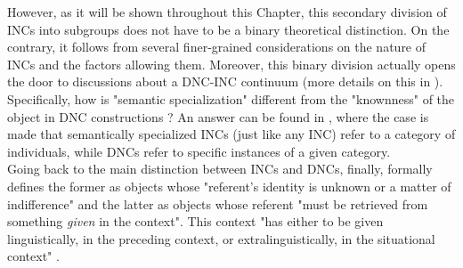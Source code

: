 However, as it will be shown throughout this Chapter, this secondary division of INCs into subgroups does not have to be a binary theoretical distinction. On the contrary, it follows from several finer-grained considerations on the nature of INCs and the factors allowing them. Moreover, this binary division actually opens the door to discussions about a DNC-INC continuum (more details on this in ). Specifically, how is "semantic specialization" different from the "knownness" of the object in DNC constructions \parencite[525]{Eu2018}? An answer can be found in \textcite[218]{Allerton1975}, where the case is made that semantically specialized INCs (just like any INC) refer to a category of individuals, while DNCs refer to specific instances of a given category.\\
Going back to the main distinction between INCs and DNCs, finally, \textcite{Fillmore1986} formally defines the former as objects whose "referent's identity is unknown or a matter of indifference" and the latter as objects whose referent "must be retrieved from something \textit{given} in the context". This context "has either to be given linguistically, in the preceding context, or extralinguistically, in the situational context" \parencite[13]{StarkMeier2017}.


